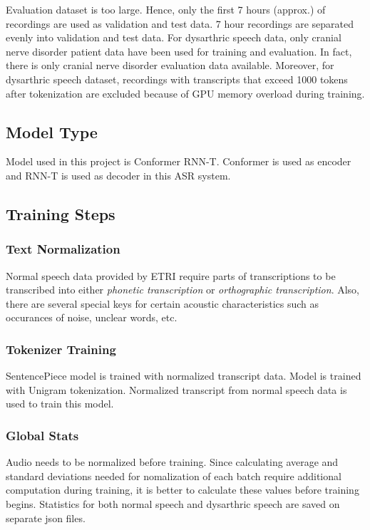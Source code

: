 \documentclass[9pt,final,a4paper]{IEEEtran}
\begin{document}
Evaluation dataset is too large. Hence, only the first 7 hours (approx.) of recordings are used as validation and test data.
7 hour recordings are separated evenly into validation and test data.
For dysarthric speech data, only cranial nerve disorder patient data have been used for training and evaluation.
In fact, there is only cranial nerve disorder evaluation data available.
Moreover, for dysarthric speech dataset, recordings with transcripts that exceed 1000 tokens after tokenization are excluded because of GPU memory overload during training.

\subsection{Model Type}

Model used in this project is Conformer RNN-T. Conformer is used as encoder and RNN-T is used as decoder in this ASR system.

\subsection{Training Steps}

\subsubsection{Text Normalization}

Normal speech data provided by ETRI require parts of transcriptions to be transcribed into either \emph{phonetic transcription} or \emph{orthographic transcription}.
Also, there are several special keys for certain acoustic characteristics such as occurances of noise, unclear words, etc.

\subsubsection{Tokenizer Training}

SentencePiece model is trained with normalized transcript data. Model is trained with Unigram tokenization.
Normalized transcript from normal speech data is used to train this model.

\subsubsection{Global Stats}

Audio needs to be normalized before training. Since calculating average and standard deviations needed for nomalization of each batch require additional computation during training, it is better to calculate these values before training begins.
Statistics for both normal speech and dysarthric speech are saved on separate json files.
\end{document}

